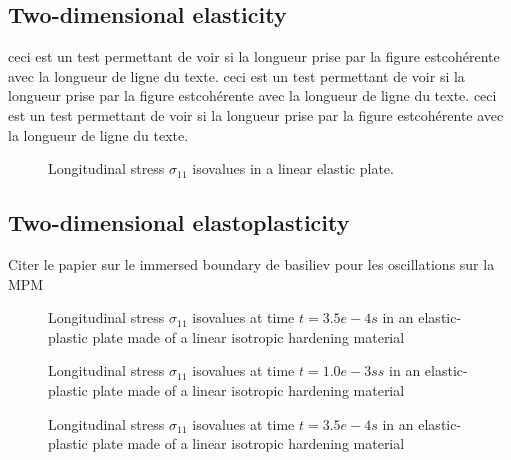 \subsection{Two-dimensional elasticity}
ceci est un test permettant de voir si la longueur prise par la figure estcohérente avec la longueur de ligne du texte. 
ceci est un test permettant de voir si la longueur prise par la figure estcohérente avec la longueur de ligne du texte. 
ceci est un test permettant de voir si la longueur prise par la figure estcohérente avec la longueur de ligne du texte. 
\begin{figure}[h!]
  \centering
  
  \caption{Longitudinal stress $\sigma_{11}$ isovalues in a linear elastic plate.}
  \label{fig:2delast_comparison1}
\end{figure}


\subsection{Two-dimensional elastoplasticity}
Citer le papier sur le immersed boundary de basiliev pour les oscillations sur la MPM

\begin{figure}[h!]
  \centering
  
  \caption{Longitudinal stress $\sigma_{11}$ isovalues at time $t=3.5e-4s$ in an elastic-plastic plate made of a linear isotropic hardening material}
  \label{fig:2dEP_comparison1}
\end{figure}

\begin{figure}[h!]
  \centering
  
  \caption{Longitudinal stress $\sigma_{11}$ isovalues at time $t=1.0e-3ss$ in an elastic-plastic plate made of a linear isotropic hardening material}
  \label{fig:2dEP_comparison2}
\end{figure}
%

\begin{figure}[h!]
  \centering
  
  \caption{Longitudinal stress $\sigma_{11}$ isovalues at time $t=3.5e-4s$ in an elastic-plastic plate made of a linear isotropic hardening material}
  \label{fig:2dEP_comparison1}
\end{figure}
